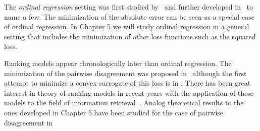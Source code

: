 The \emph{ordinal regression} setting was first studied by~\citep{McCullagh1980} and further developed in~\citep{Frank, Rennie, Chu2007, Keerthi2003, Chu2005a} to name a few. The minimization of the absolute error can be seen as a special case of ordinal regression. In Chapter 5 we will study ordinal regression in a general setting that includes the minimization of other loss functions such as the squared loss.

Ranking models appear chronologically later than ordinal regression. The minimization of the pairwise disagreement was proposed in~\citep{schapire1998learning} although the first attempt to minimize a convex surrogate of this loss is in
\citep{Herbrich2000}. There has been great interest in theory of ranking models in recent years with the application of these models to the field of information retrieval~\citep{Joachims2002, Burges2007, Sculley}. Analog theoretical results to the ones developed in Chapter 5 have been studied for the case of pairwise disagreement in~\citep{Duchi2006, Usunier}











